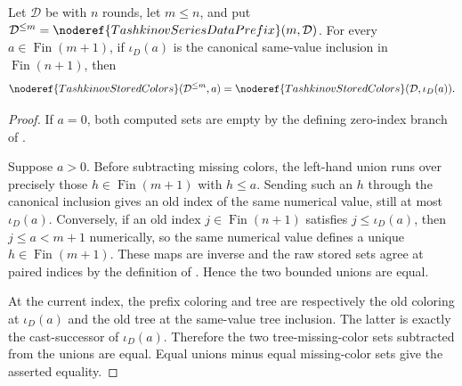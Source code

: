 \begin{lemma}
Let \(\mathcal D\) be  with \(n\) rounds, let
\(m\leq n\), and put
\(\mathcal D^{\leq m}=\noderef{TashkinovSeriesDataPrefix}(m,\mathcal D)\).
For every \(a\in\operatorname{Fin}(m+1)\), if \(\iota_D(a)\) is the
canonical same-value inclusion in \(\operatorname{Fin}(n+1)\), then
\[
 \noderef{TashkinovStoredColors}(\mathcal D^{\leq m},a)
   =\noderef{TashkinovStoredColors}(\mathcal D,\iota_D(a)).
\]
\end{lemma}
\begin{proof}
If \(a=0\), both computed sets are empty by the defining zero-index branch of
.

Suppose \(a>0\).  Before subtracting missing colors, the left-hand union runs
over precisely those \(h\in\operatorname{Fin}(m+1)\) with \(h\leq a\).
Sending such an \(h\) through the canonical inclusion gives an old index of
the same numerical value, still at most \(\iota_D(a)\).  Conversely, if an old
index \(j\in\operatorname{Fin}(n+1)\) satisfies \(j\leq\iota_D(a)\), then
\(j\leq a<m+1\) numerically, so the same numerical value defines a unique
\(h\in\operatorname{Fin}(m+1)\).  These maps are inverse and the raw stored
sets agree at paired indices by the definition of
.  Hence the two bounded unions are equal.

At the current index, the prefix coloring and tree are respectively the old
coloring at \(\iota_D(a)\) and the old tree at the same-value tree inclusion.
The latter is exactly the cast-successor of \(\iota_D(a)\).  Therefore the two
tree-missing-color sets subtracted from the unions are equal.  Equal unions
minus equal missing-color sets give the asserted equality.
\end{proof}
